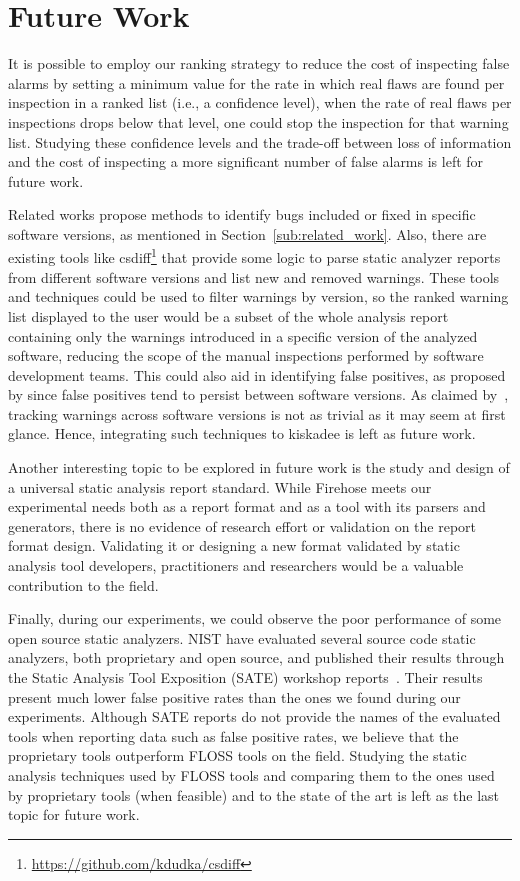 \section{Future Work}

It is possible to employ our ranking strategy to reduce the cost of
inspecting false alarms by setting a minimum value for the rate in which real
flaws are found per inspection in a ranked list (i.e., a confidence level),
when the rate of real flaws per inspections drops below that level, one could
stop the inspection for that warning list. Studying these confidence levels and
the trade-off between loss of information and the cost of inspecting a more significant
number of false alarms is left for future work.

Related works propose methods to identify bugs included or fixed in specific
software versions, as mentioned in Section~\ref{sub:related_work}.  Also, there
are existing tools like csdiff\footnote{\url{https://github.com/kdudka/csdiff}}
that provide some logic to parse static analyzer reports from different
software versions and list new and removed warnings.  These tools and
techniques could be used to filter warnings by version, so the ranked warning
list displayed to the user would be a subset of the whole analysis report
containing only the warnings introduced in a specific version of the analyzed
software, reducing the scope of the manual inspections performed by software
development teams.  This could also aid in identifying false positives, as
proposed by \cite{kim_which_2007} since false positives tend to
persist between software versions. As claimed by~\cite{spacco_tracking_2006}, tracking warnings across software versions is
not as trivial as it may seem at first glance. Hence, integrating such techniques
to kiskadee is left as future work.

Another interesting topic to be explored in future work is the study and design
of a universal static analysis report standard. While Firehose meets our
experimental needs both as a report format and as a tool with its parsers and
generators, there is no evidence of research effort or validation on the report
format design. Validating it or designing a new format validated by static
analysis tool developers, practitioners and researchers would be a valuable
contribution to the field.

Finally, during our experiments, we could observe the poor performance of some
open source static analyzers. NIST have evaluated several source code static
analyzers, both proprietary and open source, and published their results
through the Static Analysis Tool Exposition (SATE) workshop
reports~\citep{okun2013report}. Their results present much lower false positive
rates than the ones we found during our experiments. Although SATE reports do
not provide the names of the evaluated tools when reporting data such as false
positive rates, we believe that the proprietary tools outperform FLOSS tools on
the field. Studying the static analysis techniques used by FLOSS tools and
comparing them to the ones used by proprietary tools (when feasible) and to the
state of the art is left as the last topic for future work.

